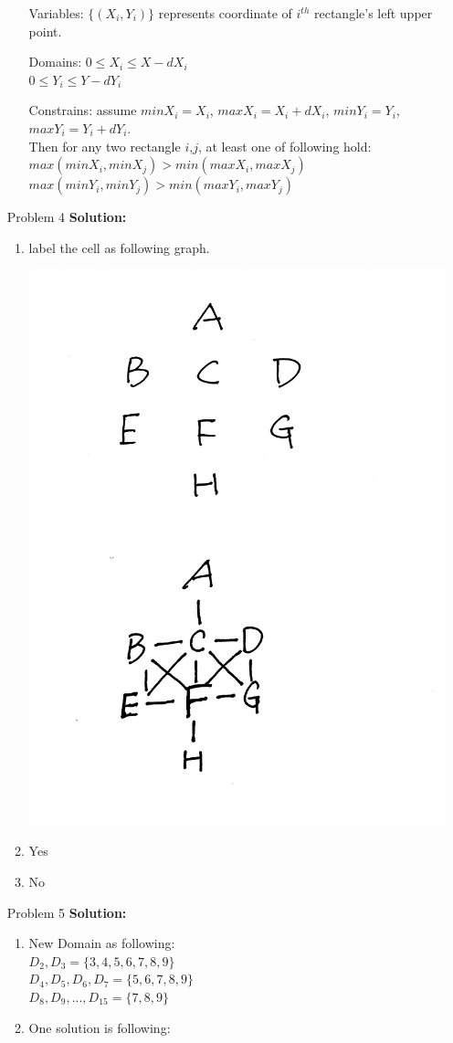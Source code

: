 \normalfont\documentclass[letterpaper,11pt]{article}
\begin{document}
\begin{enumerate}
	\begin{enumerate}
		\item[Variables:]
			$\{(X_i,Y_i)\}$ represents coordinate of $i^{th}$ rectangle's left upper point.
		\item[Domains:]
			$0 \le X_i \le X - dX_i$\\
			$0 \le Y_i \le Y - dY_i$
		\item[Constrains:]
			assume $minX_i = X_i$, $maxX_i = X_i +dX_i$, $minY_i = Y_i$, $maxY_i = Y_i +dY_i$.\\ Then for any two rectangle $i$,$j$,  at least one of following hold: \\
			$max(minX_i,minX_j) > min(maxX_i,maxX_j)$\\
			$max(minY_i,minY_j) > min(maxY_i,maxY_j)$
	\end{enumerate}	
\item[Problem 4]\textbf{Solution:}\par
	\begin{enumerate}
		\item label the cell as following graph. \par
			\includegraphics[width=2  in]{1.jpg}
		\item Yes
		\item No
	\end{enumerate}
\item[Problem 5]\textbf{Solution:}\par
	\begin{enumerate}
		\item New Domain as following:\\
		$D_2,D_3 = \{3,4,5,6,7,8,9\}$ \\
		$D_4,D_5,D_6,D_7 = \{5,6,7,8,9\}$ \\
		$D_8,D_9,...,D_{15} = \{7,8,9\}$
		\item One solution is following:\\

\end{enumerate}
\end{enumerate}
\end{document}
